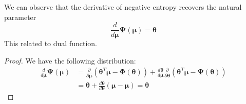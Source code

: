 \begin{lemma} 
    We can observe that the derivative of negative entropy recovers the natural parameter
    \begin{equation*}
        \frac{d}{d\boldsymbol \mu} \boldsymbol \Psi(\boldsymbol \mu) = \boldsymbol \theta
    \end{equation*}
    This related to dual function.
\end{lemma}
\begin{proof}
    We have the following distribution:
    \begin{equation*}
    \begin{aligned}
        \frac{d}{d\boldsymbol \mu} \boldsymbol \Psi(\boldsymbol \mu) &= \frac{\partial}{\partial\boldsymbol \mu}(\boldsymbol \theta^T\boldsymbol \mu - \boldsymbol \Phi(\boldsymbol \theta)) + \frac{d\boldsymbol \theta}{d\boldsymbol \mu}\frac{\partial}{\partial \boldsymbol \theta} (\boldsymbol \theta^T\boldsymbol \mu - \boldsymbol \Psi(\boldsymbol \theta)) \\
        &= \boldsymbol \theta + \frac{d\boldsymbol \theta}{d\boldsymbol \theta} (\boldsymbol \mu-\boldsymbol \mu) = \boldsymbol \theta
    \end{aligned}
    \end{equation*}
\end{proof}

